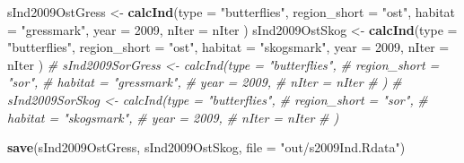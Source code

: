\documentclass[]{article}
\newenvironment{Shaded}{\begin{snugshade}}{\end{snugshade}}
\newcommand{\KeywordTok}[1]{\textcolor[rgb]{0.13,0.29,0.53}{\textbf{#1}}}
\newcommand{\DataTypeTok}[1]{\textcolor[rgb]{0.13,0.29,0.53}{#1}}
\newcommand{\DecValTok}[1]{\textcolor[rgb]{0.00,0.00,0.81}{#1}}
\newcommand{\StringTok}[1]{\textcolor[rgb]{0.31,0.60,0.02}{#1}}
\newcommand{\CommentTok}[1]{\textcolor[rgb]{0.56,0.35,0.01}{\textit{#1}}}
\newcommand{\NormalTok}[1]{#1}
\begin{document}
\begin{Shaded}
\begin{Highlighting}[]
\NormalTok{sInd2009OstGress <-}\StringTok{ }\KeywordTok{calcInd}\NormalTok{(}\DataTypeTok{type =} \StringTok{"butterflies"}\NormalTok{,}
                              \DataTypeTok{region_short =} \StringTok{"ost"}\NormalTok{,}
                              \DataTypeTok{habitat =} \StringTok{"gressmark"}\NormalTok{,}
                              \DataTypeTok{year =} \DecValTok{2009}\NormalTok{,}
                              \DataTypeTok{nIter =}\NormalTok{ nIter}
\NormalTok{                              )}
\NormalTok{sInd2009OstSkog <-}\StringTok{ }\KeywordTok{calcInd}\NormalTok{(}\DataTypeTok{type =} \StringTok{"butterflies"}\NormalTok{,}
                              \DataTypeTok{region_short =} \StringTok{"ost"}\NormalTok{,}
                              \DataTypeTok{habitat =} \StringTok{"skogsmark"}\NormalTok{,}
                              \DataTypeTok{year =} \DecValTok{2009}\NormalTok{,}
                              \DataTypeTok{nIter =}\NormalTok{ nIter}
\NormalTok{                              )}
\CommentTok{# sInd2009SorGress <- calcInd(type = "butterflies",}
\CommentTok{#                               region_short = "sor",}
\CommentTok{#                               habitat = "gressmark",}
\CommentTok{#                               year = 2009,}
\CommentTok{#                               nIter = nIter}
\CommentTok{#                               )}
\CommentTok{# sInd2009SorSkog <- calcInd(type = "butterflies",}
\CommentTok{#                               region_short = "sor",}
\CommentTok{#                               habitat = "skogsmark",}
\CommentTok{#                               year = 2009,}
\CommentTok{#                               nIter = nIter}
\CommentTok{#                               )}

\KeywordTok{save}\NormalTok{(sInd2009OstGress, sInd2009OstSkog, }\DataTypeTok{file =} \StringTok{"out/s2009Ind.Rdata"}\NormalTok{)}
\end{Highlighting}
\end{Shaded}
\end{document}
